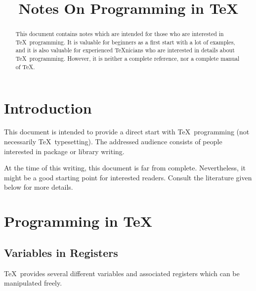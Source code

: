 \documentclass[a4paper]{ltxdoc}
\title{Notes On Programming in \TeX}%
\begin{document}
\maketitle
\begin{abstract}%
	This document contains notes which are intended for those who are interested in \TeX\ programming. It is valuable for beginners as a first start with a lot of examples, and it is also valuable for experienced \TeX nicians who are interested in details about \TeX\ programming. However, it is neither a complete reference, nor a complete manual of \TeX.
\end{abstract}
\tableofcontents
\section{Introduction}
This document is intended to provide a direct start with \TeX\ programming (not necessarily \TeX\ typesetting). The addressed audience consists of people interested in package or library writing.

At the time of this writing, this document is far from complete. Nevertheless, it might be a good starting point for interested readers. Consult the literature given below for more details.

\section{Programming in \TeX}
\subsection{Variables in Registers}
\TeX\ provides several different variables and associated registers which can be manipulated freely.
\end{document}
